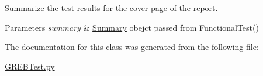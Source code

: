 Summarize the test results for the cover page of the report. 


\begin{DoxyParams}{Parameters}
{\em summary} & \hyperlink{class_g_r_e_b_test_1_1_summary}{Summary} obejct passed from Functional\+Test() \\
\hline
\end{DoxyParams}


The documentation for this class was generated from the following file\+:\begin{DoxyCompactItemize}
\item 
\hyperlink{_g_r_e_b_test_8py}{G\+R\+E\+B\+Test.\+py}\end{DoxyCompactItemize}
